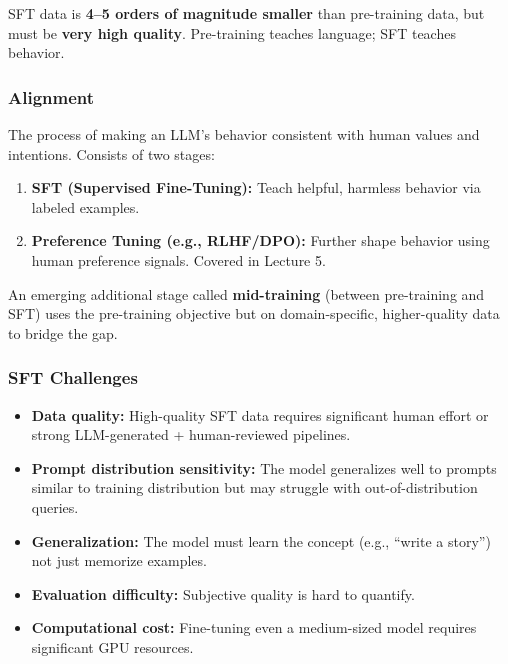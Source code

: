 \documentclass[11pt, a4paper]{article}
\begin{document}
SFT data is \textbf{4--5 orders of magnitude smaller} than pre-training data, but must be \textbf{very high quality}. Pre-training teaches language; SFT teaches behavior.

\subsubsection{Alignment}

\begin{defbox}[Alignment]
The process of making an LLM's behavior consistent with human values and intentions. Consists of two stages:
\begin{enumerate}[leftmargin=1.5em]
  \item \textbf{SFT (Supervised Fine-Tuning):} Teach helpful, harmless behavior via labeled examples.
  \item \textbf{Preference Tuning (e.g., RLHF/DPO):} Further shape behavior using human preference signals. Covered in Lecture 5.
\end{enumerate}
An emerging additional stage called \textbf{mid-training} (between pre-training and SFT) uses the pre-training objective but on domain-specific, higher-quality data to bridge the gap.
\end{defbox}

\subsubsection{SFT Challenges}

\begin{itemize}[leftmargin=2em]
  \item \textbf{Data quality:} High-quality SFT data requires significant human effort or strong LLM-generated + human-reviewed pipelines.
  \item \textbf{Prompt distribution sensitivity:} The model generalizes well to prompts similar to training distribution but may struggle with out-of-distribution queries.
  \item \textbf{Generalization:} The model must learn the concept (e.g., ``write a story'') not just memorize examples.
  \item \textbf{Evaluation difficulty:} Subjective quality is hard to quantify.
  \item \textbf{Computational cost:} Fine-tuning even a medium-sized model requires significant GPU resources.
\end{itemize}

\end{document}
